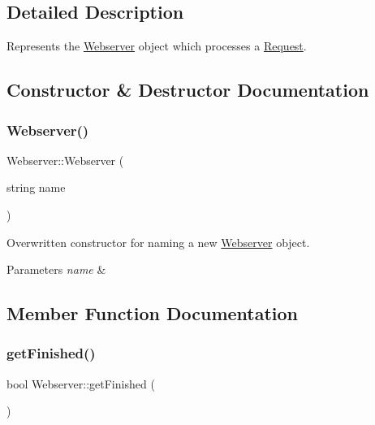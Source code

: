 \subsection{Detailed Description}
Represents the \hyperlink{classWebserver}{Webserver} object which processes a \hyperlink{classRequest}{Request}. 

\subsection{Constructor \& Destructor Documentation}
\mbox{\label{classWebserver_ac66530e2c75f4489f3fd0a37d1265a21}} 
\subsubsection{\texorpdfstring{Webserver()}{Webserver()}}
{\footnotesize\ttfamily Webserver\+::\+Webserver (\begin{DoxyParamCaption}\item[{string}]{name }\end{DoxyParamCaption})\hspace{0.3cm}{\ttfamily [inline]}}



Overwritten constructor for naming a new \hyperlink{classWebserver}{Webserver} object. 


\begin{DoxyParams}{Parameters}
{\em name} & \\
\hline
\end{DoxyParams}


\subsection{Member Function Documentation}
\mbox{\label{classWebserver_a2244e2e2e5f992498a17b5caa90af73b}} 
\subsubsection{\texorpdfstring{get\+Finished()}{getFinished()}}
{\footnotesize\ttfamily bool Webserver\+::get\+Finished (\begin{DoxyParamCaption}{ }\end{DoxyParamCaption})\hspace{0.3cm}{\ttfamily [inline]}}



